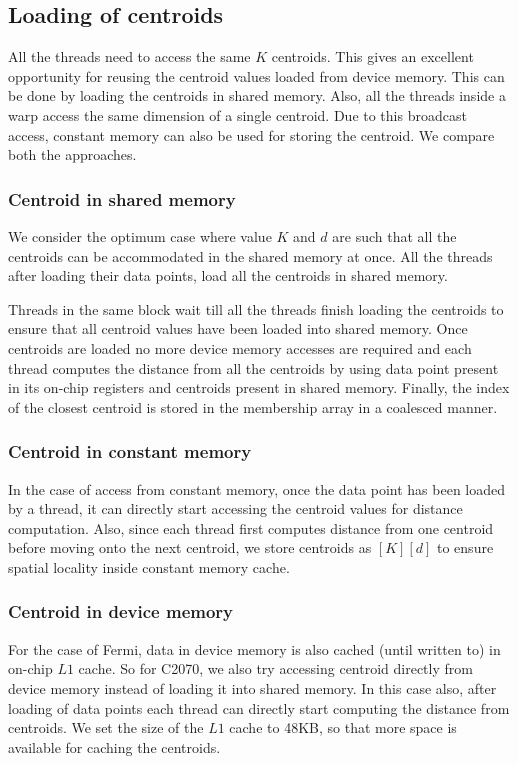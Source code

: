 \subsection{Loading of centroids}
All the threads need to access the same $K$ centroids. This gives an excellent opportunity for reusing the centroid values loaded from device memory. This can be done by loading the centroids in shared memory. Also, all the threads inside a warp access the same dimension of a single centroid. Due to this broadcast access, constant memory can also be used for storing the centroid. We compare both the approaches.
\subsubsection{Centroid in shared memory}
We consider the optimum case where value $K$ and $d$ are such that all the centroids can be accommodated in the shared memory at once. All the threads after loading their data points, load all the centroids in shared memory. 

Threads in the same block wait till all the threads finish loading the centroids to ensure that all centroid values have been loaded into shared memory. Once centroids are loaded no more device memory accesses are required and each thread computes the distance from all the centroids by using data point present in its on-chip registers and centroids present in shared memory. Finally, the index of the closest centroid is stored in the membership array in a coalesced manner.
\subsubsection{Centroid in constant memory}\label{sec:centConstt}
In the case of access from constant memory, once the data point has been loaded by a thread, it can directly start accessing the centroid values for distance computation. Also, since each thread first computes distance from one centroid before moving onto the next centroid, we store centroids as $[K][d]$ to ensure spatial locality inside constant memory cache.
\subsubsection{Centroid in device memory}
For the case of Fermi, data in device memory is also cached (until written to) in on-chip $L1$ cache. So for C2070, we also try accessing centroid directly from device memory instead of loading it into shared memory. In this case also, after loading of data points each thread can directly start computing the distance from centroids. We set the size of the $L1$ cache to 48KB, so that more space is available for caching the centroids.

